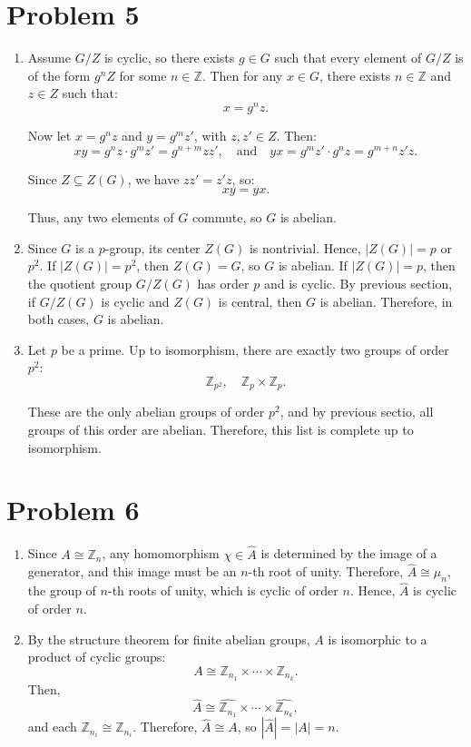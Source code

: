 \documentclass[12pt]{article}
\begin{document}
\section*{Problem 5}
\begin{enumerate}[label=(\arabic*)] 

\item Assume $G/Z$ is cyclic, so there exists $g \in G$ such that every element of $G/Z$ is of the form $g^nZ$ for some $n \in \mathbb{Z}$. Then for any $x \in G$, there exists $n \in \mathbb{Z}$ and $z \in Z$ such that:
\[
x = g^n z.
\]

Now let $x = g^n z$ and $y = g^m z'$, with $z, z' \in Z$. Then:
\[
xy = g^n z \cdot g^m z' = g^{n+m} zz', \quad \text{and} \quad yx = g^m z' \cdot g^n z = g^{m+n} z'z.
\]

Since $Z \subseteq Z(G)$, we have $zz' = z'z$, so:
\[
xy = yx.
\]

Thus, any two elements of $G$ commute, so $G$ is abelian.

\item Since $G$ is a $p$-group, its center $Z(G)$ is nontrivial. Hence, $|Z(G)| = p$ or $p^2$. 
If $|Z(G)| = p^2$, then $Z(G) = G$, so $G$ is abelian. 
If $|Z(G)| = p$, then the quotient group $G/Z(G)$ has order $p$ and is cyclic. By previous section, if $G/Z(G)$ is cyclic and $Z(G)$ is central, then $G$ is abelian. 
Therefore, in both cases, $G$ is abelian.

\item Let $p$ be a prime. Up to isomorphism, there are exactly two groups of order $p^2$:
\[
\mathbb{Z}_{p^2}, \quad \mathbb{Z}_p \times \mathbb{Z}_p.
\]

These are the only abelian groups of order $p^2$, and by previous sectio, all groups of this order are abelian. Therefore, this list is complete up to isomorphism.
\end{enumerate}
\section*{Problem 6}
\begin{enumerate}[label=(\arabic*)] 
\item Since $A \cong \mathbb{Z}_n$, any homomorphism $\chi \in \widehat{A}$ is determined by the image of a generator, and this image must be an $n$-th root of unity. Therefore, $\widehat{A} \cong \mu_n$, the group of $n$-th roots of unity, which is cyclic of order $n$. 
Hence, $\widehat{A}$ is cyclic of order $n$.

\item By the structure theorem for finite abelian groups, $A$ is isomorphic to a product of cyclic groups:
\[
A \cong \mathbb{Z}_{n_1} \times \cdots \times \mathbb{Z}_{n_k}.
\]
Then,
\[
\widehat{A} \cong \widehat{\mathbb{Z}_{n_1}} \times \cdots \times \widehat{\mathbb{Z}_{n_k}},
\]
and each $\widehat{\mathbb{Z}_{n_i}} \cong \mathbb{Z}_{n_i}$. Therefore, $\widehat{A} \cong A$, so $|\widehat{A}| = |A| = n$.
\end{enumerate}
\end{document}
